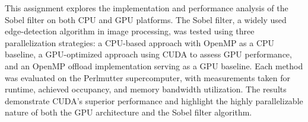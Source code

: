 

This assignment explores the implementation and performance analysis of the Sobel filter on both CPU and GPU platforms. The Sobel filter, a widely used edge-detection algorithm in image processing, was tested using three parallelization strategies: a CPU-based approach with OpenMP as a CPU baseline, a GPU-optimized approach using CUDA to assess GPU performance, and an OpenMP offload implementation serving as a GPU baseline. Each method was evaluated on the Perlmutter supercomputer, with measurements taken for runtime, achieved occupancy, and memory bandwidth utilization. The results demonstrate CUDA’s superior performance and highlight the highly parallelizable nature of both the GPU architecture and the Sobel filter algorithm.